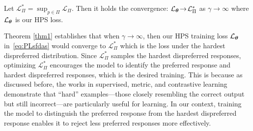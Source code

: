 \begin{theorem}
\label{thm1}
Let $\mathcal{L}_{\Pi}^{*} = \sup_{p\in\Pi} \mathcal{L}_{\Pi}$. Then it holds the convergence:  $\mathcal{L}_{{\boldsymbol{\theta}}} \!\rightarrow \!\mathcal{L}_{\Pi}^{*}$ as $\gamma\!\rightarrow \!\infty$ where $\mathcal{L}_{{\boldsymbol{\theta}}}$ is our HPS  loss. 
\end{theorem}
\vspace{-3pt}
Theorem \ref{thm1} establishes that when $\gamma\rightarrow \infty$, then our HPS training loss  $\mathcal{L}_{{\boldsymbol{\theta}}} $ in~\eqref{eq:PLsfdas} would converge to  $\mathcal{L}_{\Pi}^{*}$  which is the loss under the  hardest  dispreferred  distribution. Since $\mathcal{L}_{\Pi}^{*}$ samples the hardest dispreferred   responses, optimizing $\mathcal{L}_{\Pi}^{*}$ encourages the model to identify the preferred response and   hardest dispreferred   responses, which is the desired training. This is because as discussed before,   the works in supervised, metric, and contrastive learning~\cite{schroff2015facenet, oh2016deep, contrastivehard} demonstrate that ``hard” examples—those closely resembling the correct output but still incorrect—are particularly useful for  learning. In our context, training the model to distinguish the preferred response from the hardest dispreferred response   enables it to reject less preferred responses  more effectively.


